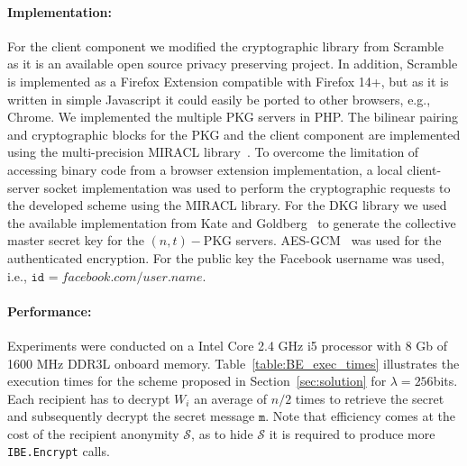 \documentclass{llncs}
\newcommand{\secref}[1]{{Section}~\ref{#1}}
\newcommand{\msg}{\ensuremath{\mathtt{m}}}
\newcommand{\id}[1]{\ensuremath{\mathtt{id}_{#1}}}
\begin{document}
\paragraph{Implementation:}
For the client component we modified the cryptographic library from Scramble~\cite{BeatoScramble} as it is an available open source privacy preserving project. In addition, Scramble is implemented as a Firefox Extension compatible with Firefox 14+, but as it is written in simple Javascript it could easily be ported to other browsers, e.g., Chrome. 
We implemented the multiple PKG servers in PHP.
The bilinear pairing and cryptographic blocks for the PKG and the client component are implemented using the multi-precision {MIRACL} library~\cite{scott2003miracl}. To overcome the limitation of accessing binary code from a browser extension implementation, a local client-server socket implementation was used to perform the cryptographic requests to the developed scheme using the {MIRACL} library.
For the DKG library we used the available implementation from Kate and Goldberg~\cite{DBLP:conf/icdcs/KateG09,dkg-software} to generate the collective master secret key for the $(n,t)-$PKG servers. AES-GCM~\cite{rfc5288} was used for the authenticated encryption. For the public key the Facebook username was used, i.e., $\id{}=facebook.com/user.name$. 


\paragraph{Performance:} 
Experiments were conducted on a Intel Core 2.4 GHz i5 processor with 8 Gb of 1600 MHz DDR3L onboard memory. Table~\ref{table:BE_exec_times} illustrates the 
execution times for the scheme proposed in \secref{sec:solution} for $\lambda=256$bits. Each recipient has to decrypt $W_i$ an average of $n/2$ times to retrieve the secret and subsequently decrypt the secret message \msg. Note that efficiency comes at the cost of the recipient anonymity $\mathcal{S}$, as to hide $\mathcal{S}$ it is required to produce more \texttt{IBE.Encrypt} calls.
\end{document}

